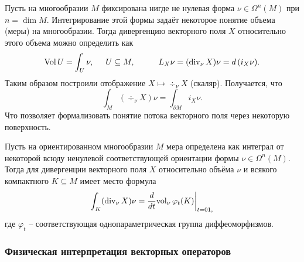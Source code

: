 \begin{to_tas}
     Пусть на многообразии $M$ фиксирована нигде не нулевая форма $\nu \in \Omega^n(M)$ при $n = \dim M$. Интегрирование этой формы задаёт некоторое понятие объема (меры) на многообразии. Тогда дивергенцию векторного поля $X$ относительно этого объема можно определить как
     \begin{equation*}
        \text{Vol}\, U = \int_U \nu, 
        \hspace{0.5cm} 
        U \subseteq M,
        \hspace{1cm}
         L_X \nu = (\div_\nu X) \nu = d\, (i_X \nu).
     \end{equation*}
     Таким образом построили отображение $X \mapsto \div_\nu X$ (скаляр). Получается, что
    \begin{equation*}
        \int_M (\div_\nu X) \nu = \int_{\partial M} i_X \nu.
    \end{equation*}
    Что позволяет формализовать понятие потока векторного поля через некоторую поверхность.
\end{to_tas}

\begin{to_thr}
     Пусть на ориентированном многообразии $M$ мера определена как интеграл от некоторой всюду ненулевой соответствующей ориентации формы $\nu \in \Omega^n (M)$. Тогда для дивергенции векторного поля $X$ относительно объёма $\nu$ и всякого компактного $K \subseteq M$ имеет место формула
     \begin{equation*}
         \int_K (\div_\nu X) \nu = \frac{d}{dt} \textnormal{vol}_\nu\, \varphi_t (K) \bigg|_{t=01,}
     \end{equation*}
     где $\varphi_t$ -- соответствующая однопараметрическая группа диффеоморфизмов.
\end{to_thr}

\subsubsection*{Физическая интерпретация векторных операторов}

